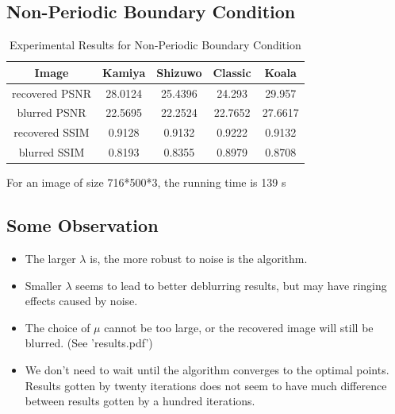 \documentclass{article}
\theoremstyle{plain} \newtheorem{thm}{Theorem}
\begin{document}
\subsection{Non-Periodic Boundary Condition}
\begin{table}[htbp]
	\centering
	\caption{Experimental Results for Non-Periodic Boundary Condition}
	\begin{tabular}{c|cccc}
		\toprule[.07cm]
		Image & Kamiya & Shizuwo & Classic & Koala \\
		\midrule[.07cm]
		recovered PSNR & 28.0124 & 25.4396 & 24.293 & 29.957 \\
		blurred PSNR & 22.5695 & 22.2524 & 22.7652 & 27.6617 \\
		\midrule
		recovered SSIM & 0.9128 & 0.9132 & 0.9222 & 0.9132 \\
		blurred SSIM & 0.8193 & 0.8355 & 0.8979 & 0.8708 \\
		\bottomrule[.07cm]
	\end{tabular}%
	\label{tab:2}%
\end{table}%

For an image of size 716*500*3, the running time is 139 s
\subsection{Some Observation}
\begin{itemize}
	\item The larger $\lambda$ is, the more robust to noise is the algorithm.
	\item Smaller $\lambda$ seems to lead to better deblurring results, but may have ringing effects caused by noise.
	\item The choice of $\mu$ cannot be too large, or the recovered image will still be blurred. (See 'results.pdf')
	\item We don't need to wait until the algorithm converges to the optimal points. Results gotten by twenty iterations does not seem to have much difference between results gotten by a hundred iterations.
\end{itemize}
\end{document}
